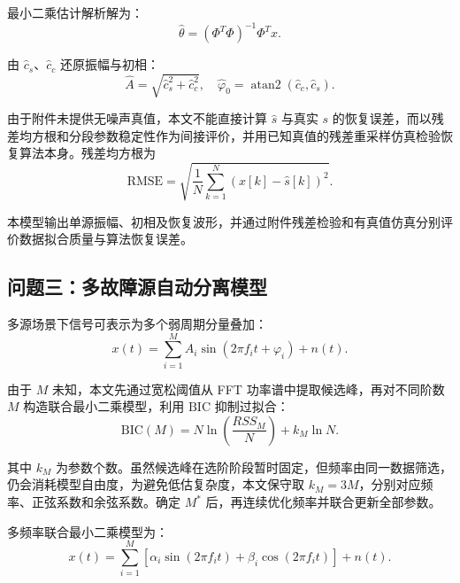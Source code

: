 \documentclass[withoutpreface,bwprint]{cumcmthesis}
\begin{document}
最小二乘估计解析解为\cite{kay1993}：
\begin{equation}
    \hat{\theta}
    =
    (\Phi^T\Phi)^{-1}\Phi^T x .
    \label{eq:ls}
\end{equation}

由 \(\hat c_s\)、\(\hat c_c\) 还原振幅与初相：
\begin{equation}
    \hat A=\sqrt{\hat c_s^2+\hat c_c^2},
    \quad
    \hat{\varphi}_0=\operatorname{atan2}(\hat c_c,\hat c_s).
    \label{eq:amp}
\end{equation}

由于附件未提供无噪声真值，本文不能直接计算 \(\hat s\) 与真实 \(s\) 的恢复误差，而以残差均方根和分段参数稳定性作为间接评价，并用已知真值的残差重采样仿真检验恢复算法本身。残差均方根为
\begin{equation}
    \mathrm{RMSE}=
    \sqrt{
    \frac{1}{N}
    \sum_{k=1}^{N}
    \left(x[k]-\hat{s}[k]\right)^2
    }.
    \label{eq:rmse}
\end{equation}

本模型输出单源振幅、初相及恢复波形，并通过附件残差检验和有真值仿真分别评价数据拟合质量与算法恢复误差。

\subsection{问题三：多故障源自动分离模型}

多源场景下信号可表示为多个弱周期分量叠加：
\begin{equation}
    x(t)=
    \sum_{i=1}^{M}A_i\sin(2\pi f_i t+\varphi_i)+n(t).
    \label{eq:multi}
\end{equation}

由于 \(M\) 未知，本文先通过宽松阈值从 FFT 功率谱中提取候选峰，再对不同阶数 \(M\) 构造联合最小二乘模型，利用 \(\mathrm{BIC}\) 抑制过拟合\cite{schwarz1978}：
\begin{equation}
    \mathrm{BIC}(M)=
    N\ln\left(\frac{RSS_M}{N}\right)+k_M\ln N .
    \label{eq:bic}
\end{equation}

其中 \(k_M\) 为参数个数。虽然候选峰在选阶阶段暂时固定，但频率由同一数据筛选，仍会消耗模型自由度，为避免低估复杂度，本文保守取 \(k_M=3M\)，分别对应频率、正弦系数和余弦系数。确定 \(M^*\) 后，再连续优化频率并联合更新全部参数。

多频率联合最小二乘模型为：
\begin{equation}
    x(t)=
    \sum_{i=1}^{M}
    \left[
    \alpha_i\sin(2\pi f_i t)+
    \beta_i\cos(2\pi f_i t)
    \right]
    +n(t).
    \label{eq:jointls}
\end{equation}
\end{document}
